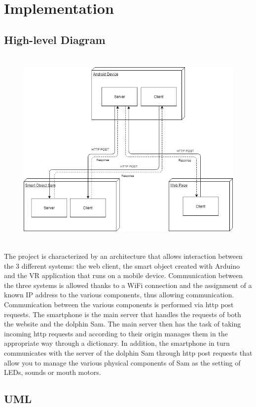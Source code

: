 \documentclass [12pt]{article}
\begin{document}
\section{Implementation}
\subsection{High-level Diagram}

\begin{figure}[ht!]
\centering
\includegraphics[height=10cm,width=13cm]{HWarchitecture.jpg}
\end{figure}   
The project is characterized by an architecture that allows interaction between the 3 different systems: the web client, the smart object created with Arduino and the VR application that runs on a mobile device.
Communication between the three systems is allowed thanks to a WiFi connection and the assignment of a known IP address to the various components, thus allowing communication. 
Communication between the various components is performed via http post requests.
The smartphone is the main server that handles the requests of both the website and the dolphin Sam. The main server then has the task of taking incoming http requests and according to their origin manages them in the appropriate way through a dictionary. In addition, the smartphone in turn communicates with the server of the dolphin Sam through http post requests that allow you to manage the various physical components of Sam as the setting of LEDs, sounds or mouth motors.
\clearpage

\subsection{UML}
\end{document}

